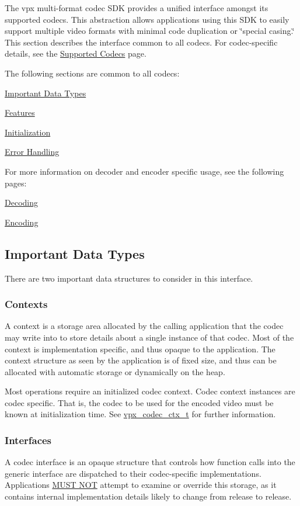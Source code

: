 The vpx multi-\/format codec S\+DK provides a unified interface amongst its supported codecs. This abstraction allows applications using this S\+DK to easily support multiple video formats with minimal code duplication or \char`\"{}special casing.\char`\"{} This section describes the interface common to all codecs. For codec-\/specific details, see the \hyperlink{group__codecs}{Supported Codecs} page.

The following sections are common to all codecs\+:
\begin{DoxyItemize}
\item \hyperlink{usage_usage_types}{Important Data Types}
\item \hyperlink{usage_usage_features}{Features}
\item \hyperlink{usage_usage_init}{Initialization}
\item \hyperlink{usage_usage_errors}{Error Handling}
\end{DoxyItemize}

For more information on decoder and encoder specific usage, see the following pages\+: \begin{DoxyItemize}
\item \hyperlink{usage_decode}{Decoding} \item \hyperlink{usage_encode}{Encoding}\end{DoxyItemize}
\hypertarget{usage_usage_types}{}\subsection{Important Data Types}\label{usage_usage_types}
There are two important data structures to consider in this interface.\hypertarget{usage_usage_ctxs}{}\subsubsection{Contexts}\label{usage_usage_ctxs}
A context is a storage area allocated by the calling application that the codec may write into to store details about a single instance of that codec. Most of the context is implementation specific, and thus opaque to the application. The context structure as seen by the application is of fixed size, and thus can be allocated with automatic storage or dynamically on the heap.

Most operations require an initialized codec context. Codec context instances are codec specific. That is, the codec to be used for the encoded video must be known at initialization time. See \hyperlink{group__codec_gad03e2dfa6ae511db7d25be6bbb336233}{vpx\+\_\+codec\+\_\+ctx\+\_\+t} for further information.\hypertarget{usage_usage_ifaces}{}\subsubsection{Interfaces}\label{usage_usage_ifaces}
A codec interface is an opaque structure that controls how function calls into the generic interface are dispatched to their codec-\/specific implementations. Applications \hyperlink{rfc2119_MUSTNOT}{M\+U\+ST N\+OT} attempt to examine or override this storage, as it contains internal implementation details likely to change from release to release.


